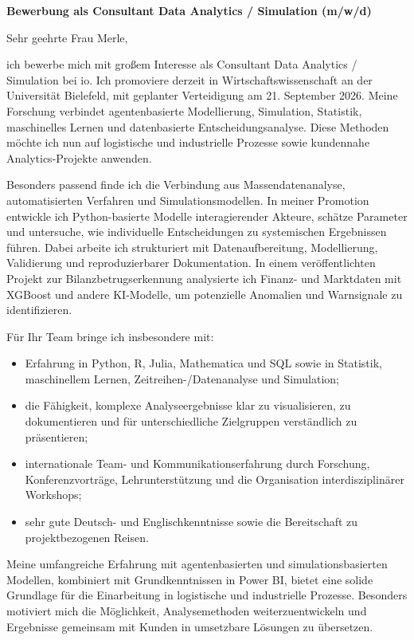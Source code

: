 \documentclass[11pt]{article}
\begin{document}
\vspace{0.15cm}

\noindent
\textbf{Bewerbung als Consultant Data Analytics / Simulation (m/w/d)}

\vspace{0.15cm}

\noindent Sehr geehrte Frau Merle,

ich bewerbe mich mit gro\ss{}em Interesse als Consultant Data Analytics / Simulation bei io. 
Ich promoviere derzeit in Wirtschaftswissenschaft an der Universität Bielefeld, 
mit geplanter Verteidigung am 21. September 2026. 
Meine Forschung verbindet agentenbasierte Modellierung, Simulation, Statistik, 
maschinelles Lernen und datenbasierte Entscheidungsanalyse. 
Diese Methoden möchte ich nun auf logistische und industrielle Prozesse sowie kundennahe Analytics-Projekte anwenden.

Besonders passend finde ich die Verbindung aus Massendatenanalyse, 
automatisierten Verfahren und Simulationsmodellen. 
In meiner Promotion entwickle ich Python-basierte Modelle interagierender Akteure, 
schätze Parameter und untersuche, wie individuelle Entscheidungen zu systemischen Ergebnissen führen. 
Dabei arbeite ich strukturiert mit Datenaufbereitung, Modellierung, Validierung und reproduzierbarer Dokumentation. 
In einem veröffentlichten Projekt zur Bilanzbetrugserkennung analysierte ich Finanz- und Marktdaten mit XGBoost und andere KI-Modelle, 
um potenzielle Anomalien und Warnsignale zu identifizieren.

Für Ihr Team bringe ich insbesondere mit:

\begin{itemize}
    \item Erfahrung in Python, R, Julia, Mathematica und SQL sowie in Statistik, maschinellem Lernen, Zeitreihen-/Datenanalyse und Simulation;
    \item die Fähigkeit, komplexe Analyseergebnisse klar zu visualisieren, zu dokumentieren und für unterschiedliche Zielgruppen verständlich zu präsentieren;
    \item internationale Team- und Kommunikationserfahrung durch Forschung, Konferenzvorträge, Lehrunterstützung und die Organisation interdisziplinärer Workshops;
    \item sehr gute Deutsch- und Englischkenntnisse sowie die Bereitschaft zu projektbezogenen Reisen.
\end{itemize}

Meine umfangreiche Erfahrung mit agentenbasierten und simulationsbasierten Modellen, 
kombiniert mit Grundkenntnissen in Power BI, bietet eine solide Grundlage für die Einarbeitung in logistische und industrielle Prozesse. 
Besonders motiviert mich die Möglichkeit, Analysemethoden weiterzuentwickeln und Ergebnisse gemeinsam mit Kunden in umsetzbare Lösungen zu übersetzen.
\end{document}
